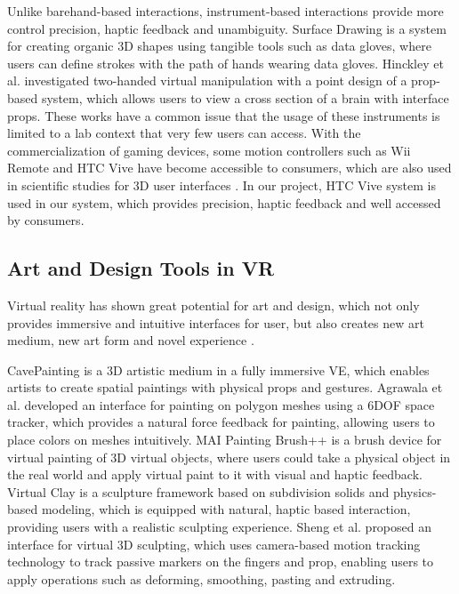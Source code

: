 \documentclass{svjour3}                     %
\begin{document}
Unlike barehand-based interactions, instrument-based interactions provide more control precision, haptic feedback and unambiguity.
Surface Drawing \cite{schkolne2001surface} is a system for creating organic 3D shapes using tangible tools such as data gloves, where users can define strokes with the path of hands wearing data gloves.
Hinckley et al. \cite{hinckley1998two} investigated two-handed virtual manipulation with a point design of a prop-based system, which allows users to view a cross section of a brain with interface props.
These works have a common issue that the usage of these instruments is limited to a lab context that very few users can access.
%
With the commercialization of gaming devices, some motion controllers such as Wii Remote and HTC Vive have become accessible to consumers, which are also used in scientific studies for 3D user interfaces \cite{wingcrave2010wii,niehorster2017accuracy}.
%
In our project, HTC Vive system is used in our system, which provides precision, haptic feedback and well accessed by consumers.

\subsection{Art and Design Tools in VR}
\label{sec:art}
Virtual reality has shown great potential for art and design, which not only provides immersive and intuitive interfaces for user, but also creates new art medium, new art form and novel experience \cite{laviola20113d}.

CavePainting \cite{keefe2001cavepainting} is a 3D artistic medium in a fully immersive VE, which enables artists to create spatial paintings with physical props and gestures. Agrawala et al. \cite{agrawala19953d} developed an interface for painting on polygon meshes using a 6DOF space tracker, which provides a natural force feedback for painting, allowing users to place colors on meshes intuitively. MAI Painting Brush++ \cite{otsuki2017brush} is a brush device for virtual painting of 3D virtual objects, where users could take a physical object in the real world and apply virtual paint to it with visual and haptic feedback.
Virtual Clay \cite{mcdonnell2001virtual} is a sculpture framework based on subdivision solids and physics-based modeling, which is equipped with natural, haptic based interaction, providing users with a realistic sculpting experience. Sheng et al. \cite{sheng2006interface} proposed an interface for virtual 3D sculpting, which uses camera-based motion tracking technology to track passive markers on the fingers and prop, enabling users to apply operations such as deforming, smoothing, pasting and extruding.
\end{document}
